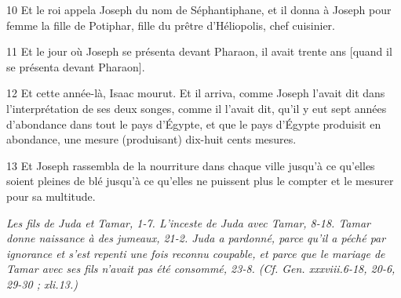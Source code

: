 \par 10 Et le roi appela Joseph du nom de Séphantiphane, et il donna à Joseph pour femme la fille de Potiphar, fille du prêtre d'Héliopolis, chef cuisinier.
\par 11 Et le jour où Joseph se présenta devant Pharaon, il avait trente ans [quand il se présenta devant Pharaon].
\par 12 Et cette année-là, Isaac mourut. Et il arriva, comme Joseph l'avait dit dans l'interprétation de ses deux songes, comme il l'avait dit, qu'il y eut sept années d'abondance dans tout le pays d'Égypte, et que le pays d'Égypte produisit en abondance, une mesure (produisant) dix-huit cents mesures.
\par 13 Et Joseph rassembla de la nourriture dans chaque ville jusqu'à ce qu'elles soient pleines de blé jusqu'à ce qu'elles ne puissent plus le compter et le mesurer pour sa multitude.


\par \textit{Les fils de Juda et Tamar, 1-7. L'inceste de Juda avec Tamar, 8-18. Tamar donne naissance à des jumeaux, 21-2. Juda a pardonné, parce qu'il a péché par ignorance et s'est repenti une fois reconnu coupable, et parce que le mariage de Tamar avec ses fils n'avait pas été consommé, 23-8. (Cf. Gen. xxxviii.6-18, 20-6, 29-30 ; xli.13.)}

